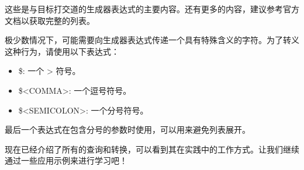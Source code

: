 这些是与目标打交道的生成器表达式的主要内容。还有更多的内容，建议参考官方文档以获取完整的列表。


极少数情况下，可能需要向生成器表达式传递一个具有特殊含义的字符。为了转义这种行为，请使用以下表达式：

\begin{itemize}
\item
\$<ANGLE-R>: 一个 > 符号。

\item
\$<COMMA>: 一个逗号符号。

\item
\$<SEMICOLON>: 一个分号符号。
\end{itemize}

最后一个表达式在包含分号的参数时使用，可以用来避免列表展开。

现在已经介绍了所有的查询和转换，可以看到其在实践中的工作方式。让我们继续通过一些应用示例来进行学习吧！









